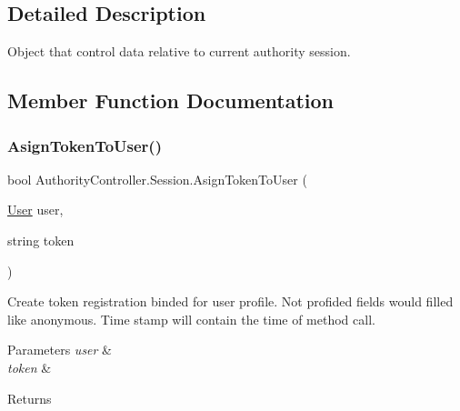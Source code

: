 \subsection{Detailed Description}
Object that control data relative to current authority session. 



\subsection{Member Function Documentation}
\mbox{\label{class_authority_controller_1_1_session_a798dbdfeeb3ce9156d99d8b7962d9528}} 
\subsubsection{\texorpdfstring{Asign\+Token\+To\+User()}{AsignTokenToUser()}\hspace{0.1cm}{\footnotesize\ttfamily [1/2]}}
{\footnotesize\ttfamily bool Authority\+Controller.\+Session.\+Asign\+Token\+To\+User (\begin{DoxyParamCaption}\item[{\mbox{\hyperlink{class_authority_controller_1_1_data_1_1_user}{User}}}]{user,  }\item[{string}]{token }\end{DoxyParamCaption})}



Create token registration binded for user profile. Not profided fields would filled like anonymous. Time stamp will contain the time of method call. 


\begin{DoxyParams}{Parameters}
{\em user} & \\
\hline
{\em token} & \\
\hline
\end{DoxyParams}
\begin{DoxyReturn}{Returns}

\end{DoxyReturn}
\mbox{\label{class_authority_controller_1_1_session_ab164831d0a5fc909c200feba1ac882e4}} 

